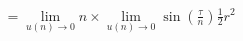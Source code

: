 \documentclass[preview]{standalone}
\begin{document}
\begin{align*}
\quad\\ &= \lim_{u(n) \to 0} n \times \lim_{u(n) \to 0} \sin \left( \frac {\tau} {n} \right) \frac {1} {2} r^2
\end{align*}
\end{document}
